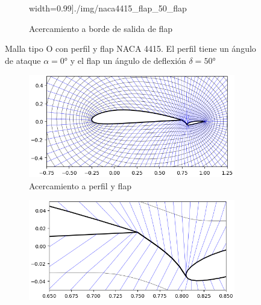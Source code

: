 \documentclass[letterpaper, openright, 12pt]{book}
\begin{document}
\begin{figure}[htbp!]
\begin{subfigure}[b]{0.45\textwidth}
                width=0.99\textwidth]{./img/naca4415_flap_50_flap}
            \caption{Acercamiento a borde de salida de flap}
            \label{fig:naca4415_flap_50_flap}
        \end{subfigure}
        \caption[Malla tjipo O con perfil y flap NACA 4415 a
            $50\si{\degree}$] {Malla tipo O con perfil y flap NACA 4415. El
            perfil tiene un ángulo de ataque $\alpha = 0\si{\degree}$ y el flap
            un ángulo de deflexión $\delta = 50\si{\degree}$}
        \label{fig:naca4415_flap_50}
    \end{figure}


    \begin{figure}[htbp!]
        \centering
        \begin{subfigure}[t]{0.45\textwidth}
            \includegraphics[keepaspectratio,
                width=0.99\textwidth]{./img/naca4415_flap_-10}
            \caption{Acercamiento a perfil y flap}
            \label{fig:naca4415_flap_-10_both}
        \end{subfigure}
        \hfill
        \begin{subfigure}[t]{0.45\textwidth}
            \includegraphics[keepaspectratio,
                width=0.99\textwidth]{./img/naca4415_flap_-10_airfoil}

\end{subfigure}
\end{figure}
\end{document}
